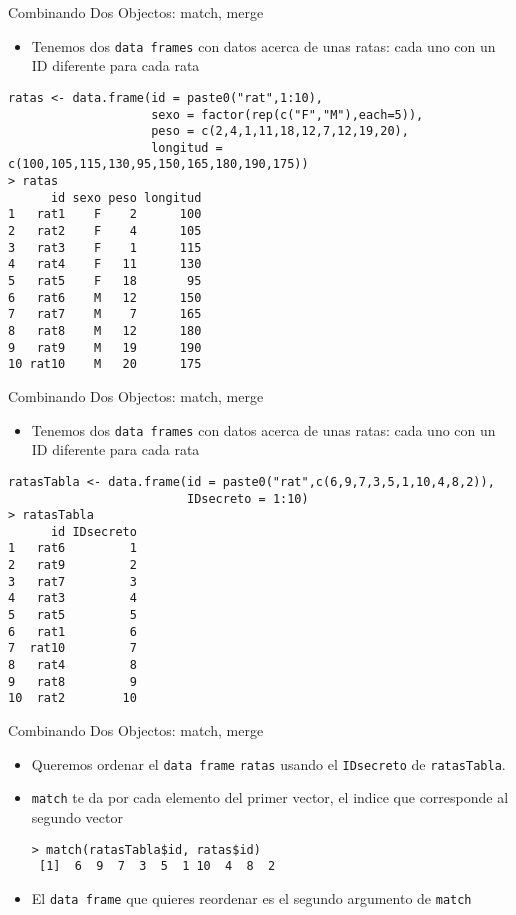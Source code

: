 \documentclass{beamer}
\begin{document}
\begin{frame}[fragile]{Combinando Dos Objectos: match, merge}
\begin{itemize}
\item Tenemos dos \texttt{data frames} con datos acerca de unas ratas: cada uno con un ID diferente para cada rata
\end{itemize}
\footnotesize
\begin{verbatim}
ratas <- data.frame(id = paste0("rat",1:10),  
                    sexo = factor(rep(c("F","M"),each=5)),
                    peso = c(2,4,1,11,18,12,7,12,19,20),
                    longitud = c(100,105,115,130,95,150,165,180,190,175))
> ratas
      id sexo peso longitud
1   rat1    F    2      100
2   rat2    F    4      105
3   rat3    F    1      115
4   rat4    F   11      130
5   rat5    F   18       95
6   rat6    M   12      150
7   rat7    M    7      165
8   rat8    M   12      180
9   rat9    M   19      190
10 rat10    M   20      175
\end{verbatim}
\end{frame}


\begin{frame}[fragile]{Combinando Dos Objectos: match, merge}
\begin{itemize}
\item Tenemos dos \texttt{data frames} con datos acerca de unas ratas: cada uno con un ID diferente para cada rata
\end{itemize}
\footnotesize
\begin{verbatim}
ratasTabla <- data.frame(id = paste0("rat",c(6,9,7,3,5,1,10,4,8,2)),
                         IDsecreto = 1:10)
> ratasTabla
      id IDsecreto
1   rat6         1
2   rat9         2
3   rat7         3
4   rat3         4
5   rat5         5
6   rat1         6
7  rat10         7
8   rat4         8
9   rat8         9
10  rat2        10
\end{verbatim}
\end{frame}

\begin{frame}[fragile]{Combinando Dos Objectos: match, merge}
\begin{itemize}
\item Queremos ordenar el \texttt{data frame} \verb=ratas= usando el \texttt{IDsecreto} de \verb=ratasTabla=.
\item \verb=match= te da por cada elemento del primer vector, el indice que corresponde al segundo vector
\begin{verbatim}
> match(ratasTabla$id, ratas$id)
 [1]  6  9  7  3  5  1 10  4  8  2
\end{verbatim}
\item El \texttt{data frame} que quieres reordenar es el segundo argumento de \verb=match=
\end{itemize}
\end{frame}
\end{document}
